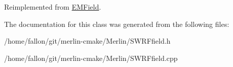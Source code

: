 Reimplemented from \hyperlink{classEMField_aa00f4f213a55c9223f6ca08463a57691}{E\+M\+Field}.



The documentation for this class was generated from the following files\+:\begin{DoxyCompactItemize}
\item 
/home/fallon/git/merlin-\/cmake/\+Merlin/S\+W\+R\+Ffield.\+h\item 
/home/fallon/git/merlin-\/cmake/\+Merlin/S\+W\+R\+Ffield.\+cpp\end{DoxyCompactItemize}
